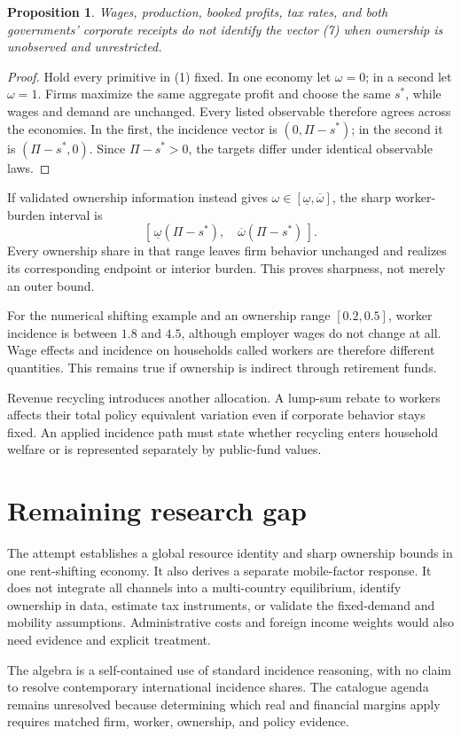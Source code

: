 \documentclass[11pt,a4paper]{article}
\newtheorem{proposition}[theorem]{Proposition}
\begin{document}
\begin{proposition}
Wages, production, booked profits, tax rates, and both governments' corporate receipts do not identify the vector (7) when ownership is unobserved and unrestricted.
\end{proposition}
\begin{proof}
Hold every primitive in (1) fixed. In one economy let $\omega=0$; in a second let $\omega=1$. Firms maximize the same aggregate profit and choose the same $s^*$, while wages and demand are unchanged. Every listed observable therefore agrees across the economies. In the first, the incidence vector is $(0,\Pi-s^*)$; in the second it is $(\Pi-s^*,0)$. Since $\Pi-s^*>0$, the targets differ under identical observable laws.
\end{proof}
If validated ownership information instead gives
$\omega\in[\underline\omega,\overline\omega]$, the sharp worker-burden interval is
\[
 [\,\underline\omega(\Pi-s^*),\quad
     \overline\omega(\Pi-s^*)\,].
 \tag{8}
\]
Every ownership share in that range leaves firm behavior unchanged and realizes its corresponding endpoint or interior burden. This proves sharpness, not merely an outer bound.

For the numerical shifting example and an ownership range $[0.2,0.5]$, worker incidence is between $1.8$ and $4.5$, although employer wages do not change at all. Wage effects and incidence on households called workers are therefore different quantities. This remains true if ownership is indirect through retirement funds.

Revenue recycling introduces another allocation. A lump-sum rebate to workers affects their total policy equivalent variation even if corporate behavior stays fixed. An applied incidence path must state whether recycling enters household welfare or is represented separately by public-fund values.
\section{Remaining research gap}
The attempt establishes a global resource identity and sharp ownership bounds in one rent-shifting economy. It also derives a separate mobile-factor response. It does not integrate all channels into a multi-country equilibrium, identify ownership in data, estimate tax instruments, or validate the fixed-demand and mobility assumptions. Administrative costs and foreign income weights would also need evidence and explicit treatment.

The algebra is a self-contained use of standard incidence reasoning, with no claim to resolve contemporary international incidence shares. The catalogue agenda remains unresolved because determining which real and financial margins apply requires matched firm, worker, ownership, and policy evidence.
\end{document}
